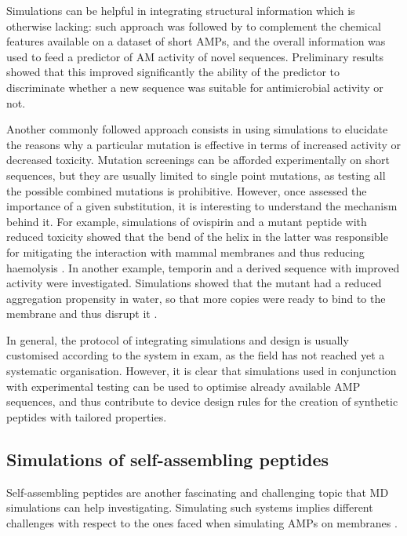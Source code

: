 Simulations can be helpful in integrating structural information which is otherwise lacking: such approach was followed by \citet{Liu2018} to complement the chemical features available on a dataset of short AMPs, and the overall information was used to feed a predictor of AM activity of novel sequences. Preliminary results showed that this improved significantly the ability of the predictor to discriminate whether a new sequence was suitable for antimicrobial activity or not.

Another commonly followed approach consists in using simulations to elucidate the reasons why a particular mutation is effective in terms of increased activity or decreased toxicity. Mutation screenings can be afforded experimentally on short sequences, but they are usually limited to single point mutations, as testing all the possible combined mutations is prohibitive. However, once assessed the importance of a given substitution, it is interesting to understand the mechanism behind it.
%
For example, simulations of ovispirin and a mutant peptide with reduced toxicity showed that the bend of the helix in the latter was responsible for mitigating the interaction with mammal membranes and thus reducing haemolysis \citep{Khandelia2005}.
%
In another example, temporin and a derived sequence with improved activity were investigated. Simulations showed that the mutant had a reduced aggregation propensity in water, so that more copies were ready to bind to the membrane and thus disrupt it \citep{Farrotti2017}.

In general, the protocol of integrating simulations and design is usually customised according to the system in exam, as the field has not reached yet a systematic organisation.
%
However, it is clear that simulations used in conjunction with experimental testing can be used to optimise already available AMP sequences, and thus contribute to device design rules for the creation of synthetic peptides with tailored properties.


\subsection{Simulations of self-assembling peptides}
Self-assembling peptides are another fascinating and challenging topic that MD simulations can help investigating. Simulating such systems implies different challenges with respect to the ones faced when simulating AMPs on membranes \citep{Frederix2018,Orsi2018}.

